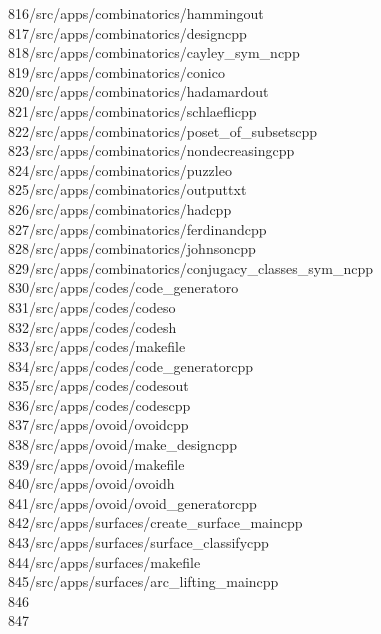\begin{tabbing}
816\>/src/apps/combinatorics/hammingout\\[0pt]
817\>/src/apps/combinatorics/designcpp\\[0pt]
818\>/src/apps/combinatorics/cayley\_sym\_ncpp\\[0pt]
819\>/src/apps/combinatorics/conico\\[0pt]
820\>/src/apps/combinatorics/hadamardout\\[0pt]
821\>/src/apps/combinatorics/schlaeflicpp\\[0pt]
822\>/src/apps/combinatorics/poset\_of\_subsetscpp\\[0pt]
823\>/src/apps/combinatorics/nondecreasingcpp\\[0pt]
824\>/src/apps/combinatorics/puzzleo\\[0pt]
825\>/src/apps/combinatorics/outputtxt\\[0pt]
826\>/src/apps/combinatorics/hadcpp\\[0pt]
827\>/src/apps/combinatorics/ferdinandcpp\\[0pt]
828\>/src/apps/combinatorics/johnsoncpp\\[0pt]
829\>/src/apps/combinatorics/conjugacy\_classes\_sym\_ncpp\\[0pt]
830\>/src/apps/codes/code\_generatoro\\[0pt]
831\>/src/apps/codes/codeso\\[0pt]
832\>/src/apps/codes/codesh\\[0pt]
833\>/src/apps/codes/makefile\\[0pt]
834\>/src/apps/codes/code\_generatorcpp\\[0pt]
835\>/src/apps/codes/codesout\\[0pt]
836\>/src/apps/codes/codescpp\\[0pt]
837\>/src/apps/ovoid/ovoidcpp\\[0pt]
838\>/src/apps/ovoid/make\_designcpp\\[0pt]
839\>/src/apps/ovoid/makefile\\[0pt]
840\>/src/apps/ovoid/ovoidh\\[0pt]
841\>/src/apps/ovoid/ovoid\_generatorcpp\\[0pt]
842\>/src/apps/surfaces/create\_surface\_maincpp\\[0pt]
843\>/src/apps/surfaces/surface\_classifycpp\\[0pt]
844\>/src/apps/surfaces/makefile\\[0pt]
845\>/src/apps/surfaces/arc\_lifting\_maincpp\\[0pt]
846\>\\[0pt]
847\>\end{tabbing}
